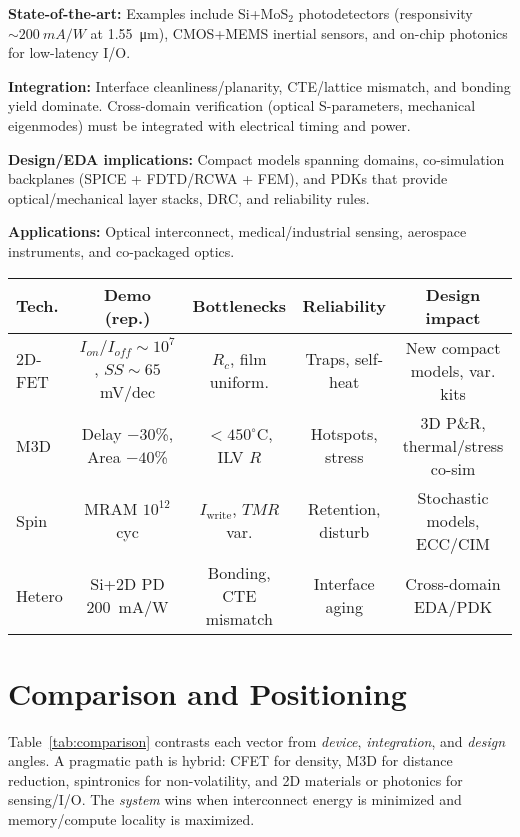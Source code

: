 \documentclass[conference]{IEEEtran}
\begin{document}
\textbf{State-of-the-art:}
Examples include Si+MoS$_2$ photodetectors (responsivity $\sim\SI{200}{mA/W}$ at \SI{1.55}{\micro m}), CMOS+MEMS inertial sensors, and on-chip photonics for low-latency I/O.

\textbf{Integration:}
Interface cleanliness/planarity, CTE/lattice mismatch, and bonding yield dominate.
Cross-domain verification (optical S-parameters, mechanical eigenmodes) must be integrated with electrical timing and power.

\textbf{Design/EDA implications:}
Compact models spanning domains, co-simulation backplanes (SPICE + FDTD/RCWA + FEM), and PDKs that provide optical/mechanical layer stacks, DRC, and reliability rules.

\textbf{Applications:}
Optical interconnect, medical/industrial sensing, aerospace instruments, and co-packaged optics.

\FloatBarrier
\begin{table*}[!t]
\centering
\caption{Comparison of post-CFET candidates (representative, not exhaustive)}
\label{tab:comparison}
\small
\begin{tabular}{@{}lcccc@{}}
\toprule
Tech. & Demo (rep.) & Bottlenecks & Reliability & Design impact \\
\midrule
2D-FET & $I_{on}/I_{off}\!\sim\!10^7$, $SS\!\sim\!65$ mV/dec &
$R_c$, film uniform. & Traps, self-heat &
New compact models, var. kits \\
M3D & Delay $-30$\%, Area $-40$\% &
$<\!450^\circ$C, ILV $R$ & Hotspots, stress &
3D P\&R, thermal/stress co-sim \\
Spin & MRAM $10^{12}$ cyc &
$I_\mathrm{write}$, $TMR$ var. & Retention, disturb &
Stochastic models, ECC/CIM \\
Hetero & Si+2D PD \SI{200}{mA/W} &
Bonding, CTE mismatch & Interface aging &
Cross-domain EDA/PDK \\
\bottomrule
\end{tabular}
\end{table*}
\FloatBarrier

\section{Comparison and Positioning}
Table~\ref{tab:comparison} contrasts each vector from \emph{device}, \emph{integration}, and \emph{design} angles.
A pragmatic path is hybrid: CFET for density, M3D for distance reduction, spintronics for non-volatility, and 2D materials or photonics for sensing/I/O.
The \emph{system} wins when interconnect energy is minimized and memory/compute locality is maximized.
\end{document}
